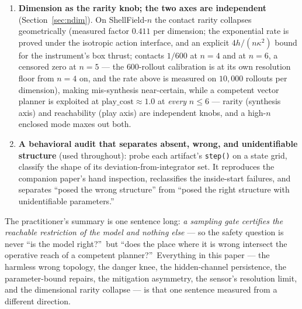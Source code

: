 \documentclass[11pt]{article}
\theoremstyle{remark}
\begin{document}
\begin{enumerate}
  topology tracks the \emph{guidance}, not the truth. A pre-registered
  flipped-summary crossover ($60$ paired seeds) is directionally
  consistent with the claim line steering the artifact ($9{:}2$
  discordant split) but not significant ($p = 0.065$), so the causal
  reading stays unearned: what is measured is the association. On the
  $n$-dimensional shell, inside-start evidence recovers $\beta_{n-1}$ up to
  $n = 5$ where outside evidence recovers it at \emph{no} $n$ --- recovery
  is start-governed, and the Niyogi--Smale--Weinberger density bound makes
  the outside failure computable in advance.
\item \textbf{Dimension as the rarity knob; the two axes are independent}
  (Section~\ref{sec:ndim}). On ShellField-$n$ the contact rarity collapses
  geometrically (measured factor $0.411$ per dimension; the exponential
  rate is proved under the isotropic action interface, and an explicit
  $4h/(n\kappa^2)$ bound for the instrument's box thrust; contacts
  $1/600$ at $n = 4$ and at $n = 6$, a censored zero at $n = 5$ ---
  the $600$-rollout calibration is at its own resolution floor from
  $n = 4$ on, and the rate above is measured on $10{,}000$ rollouts per
  dimension), making mis-synthesis
  near-certain, while a competent vector planner is exploited at
  $\mathrm{play\_cost} \approx 1.0$ at \emph{every} $n \le 6$ --- rarity
  (synthesis axis) and reachability (play axis) are independent knobs, and
  a high-$n$ enclosed mode maxes out both.
\item \textbf{A behavioral audit that separates absent, wrong, and
  unidentifiable structure} (used throughout): probe each
  artifact's \texttt{step()} on a state grid, classify the shape of its
  deviation-from-integrator set. It reproduces the companion paper's hand
  inspection, reclassifies the inside-start failures, and separates
  ``posed the wrong structure'' from ``posed the right structure with
  unidentifiable parameters.''
\end{enumerate}

The practitioner's summary is one sentence long: \emph{a sampling gate
certifies the reachable restriction of the model and nothing else} --- so
the safety question is never ``is the model right?''\ but ``does the
place where it is wrong intersect the operative reach of a competent
planner?''\ Everything in this paper --- the harmless wrong topology, the
danger knee, the hidden-channel persistence, the parameter-bound repairs,
the mitigation asymmetry, the sensor's resolution limit, and the
dimensional rarity collapse --- is that one sentence measured from a
different direction.
\end{document}
